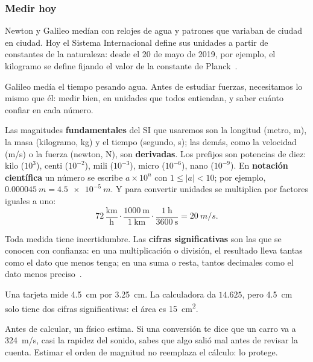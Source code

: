 \documentclass[11pt]{article}
\begin{document}
\subsubsection*{Medir hoy}

Newton y Galileo medían con relojes de agua y patrones que variaban de ciudad en ciudad. Hoy
el Sistema Internacional define sus unidades a partir de constantes de la naturaleza: desde el
20 de mayo de 2019, por ejemplo, el kilogramo se define fijando el valor de la constante de
Planck~\cite{bipm}.

\label{tema:medicion}

\begin{hilo}
Galileo medía el tiempo pesando agua. Antes de estudiar fuerzas, necesitamos lo mismo que él:
medir bien, en unidades que todos entiendan, y saber cuánto confiar en cada número.
\end{hilo}

Las magnitudes \textbf{fundamentales} del SI que usaremos son la longitud (metro, m), la masa
(kilogramo, kg) y el tiempo (segundo, s); las demás, como la velocidad (m/s) o la fuerza
(newton, N), son \textbf{derivadas}. Los prefijos son potencias de diez: kilo ($10^3$), centi
($10^{-2}$), mili ($10^{-3}$), micro ($10^{-6}$), nano ($10^{-9}$). En \textbf{notación
científica} un número se escribe $a \times 10^{n}$ con $1 \le |a| < 10$; por ejemplo,
$\qty{0,000045}{m} = \qty{4,5e-5}{m}$. Y para convertir unidades se multiplica por factores
iguales a uno:
\[
  72\,\frac{\text{km}}{\text{h}} \cdot \frac{1000\ \text{m}}{1\ \text{km}} \cdot
  \frac{1\ \text{h}}{3600\ \text{s}} = \qty{20}{m/s}.
\]

Toda medida tiene incertidumbre. Las \textbf{cifras significativas} son las que se conocen con
confianza: en una multiplicación o división, el resultado lleva tantas como el dato que menos
tenga; en una suma o resta, tantos decimales como el dato menos preciso~\cite{recurso10}.

\begin{ejemplo}
Una tarjeta mide \qty{4,5}{cm} por \qty{3,25}{cm}. La calculadora da $\num{14,625}$, pero
\qty{4,5}{cm} solo tiene dos cifras significativas: el área es \qty{15}{cm^2}.
\end{ejemplo}

\begin{aplicacion}
Antes de calcular, un físico estima. Si una conversión te dice que un carro va a
\qty{324}{m/s}, casi la rapidez del sonido, sabes que algo salió mal antes de revisar la
cuenta. Estimar el orden de magnitud no reemplaza el cálculo: lo protege.
\end{aplicacion}
\end{document}
